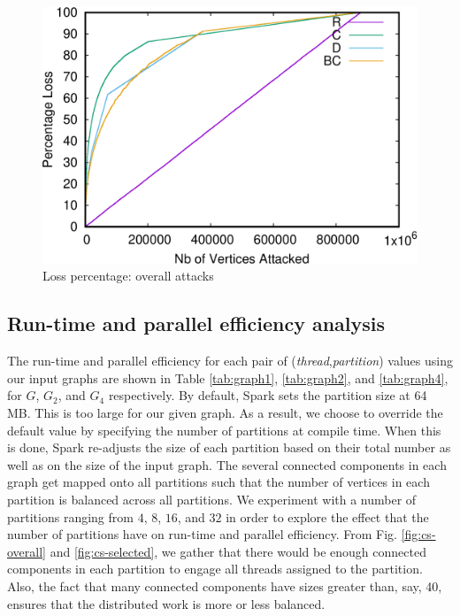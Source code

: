 \begin{figure}
\centering
\includegraphics[scale=0.35]{bench/loss-all-crop.pdf}
\caption{Loss percentage: overall attacks}
\label{fig:loss-all}
\end{figure}

\subsection{Run-time and parallel efficiency analysis}
The run-time and parallel efficiency for each pair of ({\it thread},{\it partition}) values using our input graphs are shown in Table \ref{tab:graph1}, \ref{tab:graph2}, and \ref{tab:graph4}, for $G$, $G_2$, and $G_4$ respectively. By default, Spark sets the partition size at 64 MB. This is too large for our given graph. As a result, we choose to override the default value by specifying the number of partitions at compile time. When this is done, Spark re-adjusts the size of each partition based on their total number as well as on the size of the input graph. The several connected components in each graph get mapped onto all partitions such that the number of vertices in each partition is balanced across all partitions. We experiment with a number of partitions ranging from $4$, $8$, $16$, and $32$ in order to explore the effect that the number of partitions have on run-time and parallel efficiency. From Fig. \ref{fig:cs-overall} and \ref{fig:cs-selected}, we gather that there would be enough connected components in each partition to engage all threads assigned to the partition. Also, the fact that many connected components have sizes greater than, say, 40, ensures that the distributed work is more or less balanced.

